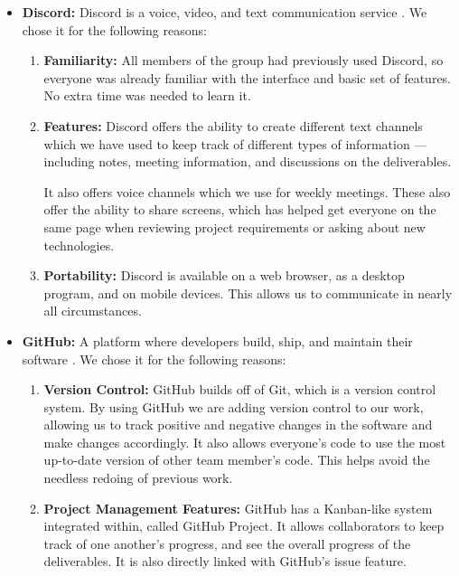 \documentclass[11pt,onside]{report}
\begin{document}
\begin{itemize}

    \item \textbf{Discord:} Discord is a voice, video, and text communication service \cite{discord}. We chose it for the following reasons:
    \begin{enumerate}
        \item \textbf{Familiarity:} All members of the group had previously used Discord, so everyone was already familiar with the interface and basic set of features. No extra time was needed to learn it.
        
        \item \textbf{Features:} Discord offers the ability to create different text channels which we have used to keep track of different types of information — including notes, meeting information, and discussions on the deliverables. 
        
        It also offers voice channels which we use for weekly meetings. These also offer the ability to share screens, which has helped get everyone on the same page when reviewing project requirements or asking about new technologies.
        
        \item \textbf{Portability:} Discord is available on a web browser, as a desktop program, and on mobile devices. This allows us to communicate in nearly all circumstances.
    \end{enumerate}
    
    \item \textbf{GitHub:} A platform where developers build, ship, and maintain their software \cite{github}. We chose it for the following reasons:
    
    \begin{enumerate}
        \item \textbf{Version Control:} GitHub builds off of Git, which is a version control system. By using GitHub we are adding version control to our work, allowing us to track positive and negative changes in the software and make changes accordingly. It also allows everyone’s code to use the most up-to-date version of other team member’s code. This helps avoid the needless redoing of previous work.
        
        \item \textbf{Project Management Features:} GitHub has a Kanban-like system integrated within, called GitHub Project. It allows collaborators to keep track of one another’s progress, and see the overall progress of the deliverables. It is also directly linked with GitHub's issue feature.
        

\end{enumerate}
\end{itemize}
\end{document}
